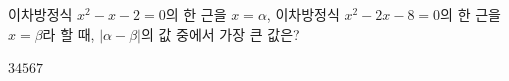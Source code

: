 이차방정식 $x^2-x-2=0$의 한 근을 $x=\alpha$, 이차방정식 $x^2-2x-8=0$의 한 근을 $x=\beta$라 할 때, $|\alpha-\beta|$의 값 중에서 가장 큰 값은?
\begin{choices32}{$3$}{$4$}{$5$}{$6$}{$7$}\end{choices32}
